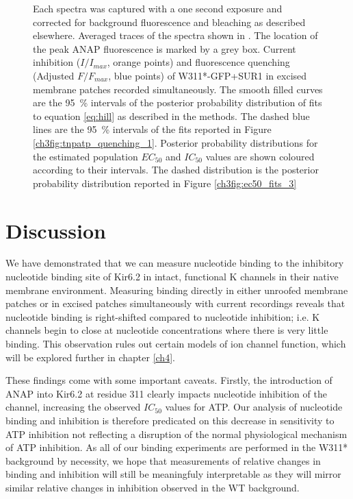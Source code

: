 \begin{figure}[h]
{	Each spectra was captured with a one second exposure and corrected for background fluorescence and bleaching as described elsewhere.
	 Averaged traces of the spectra shown in . The location of the peak ANAP fluorescence is marked by a grey box.
	 Current inhibition ($I/I_{max}$, orange points) and fluorescence quenching (Adjusted $F/F_{max}$, blue points) of W311*-GFP+SUR1 in excised membrane patches recorded simultaneously.
	The smooth filled curves are the \SI{95}{\percent} intervals of the posterior probability distribution of fits to equation \ref{eq:hill} as described in the methods.
	The dashed blue lines are the \SI{95}{\percent} intervals of the fits reported in Figure \ref{ch3fig:tnpatp_quenching_1}.
	 Posterior probability distributions for the estimated population $EC_{50}$ and $IC_{50}$ values are shown coloured according to their intervals.
	The dashed distribution is the posterior probability distribution reported in Figure \ref{ch3fig:ec50_fits_3}
	}
\end{figure}

\section{Discussion}

We have demonstrated that we can measure nucleotide binding to the inhibitory nucleotide binding site of Kir6.2 in intact, functional K\ATP{} channels in their native membrane environment.
Measuring binding directly in either unroofed membrane patches or in excised patches simultaneously with current recordings reveals that nucleotide binding is right-shifted compared to nucleotide inhibition; i.e. K\ATP{} channels begin to close at nucleotide concentrations where there is very little binding.
This observation rules out certain models of ion channel function, which will be explored further in chapter \ref{ch4}.

These findings come with some important caveats.
Firstly, the introduction of ANAP into Kir6.2 at residue 311 clearly impacts nucleotide inhibition of the channel, increasing the observed $IC_{50}$ values for ATP.
Our analysis of nucleotide binding and inhibition is therefore predicated on this decrease in sensitivity to ATP inhibition not reflecting a disruption of the normal physiological mechanism of ATP inhibition.
As all of our binding experiments are performed in the W311* background by necessity, we hope that measurements of relative changes in binding and inhibition will still be meaningfuly interpretable as they will mirror similar relative changes in inhibition observed in the WT background.

